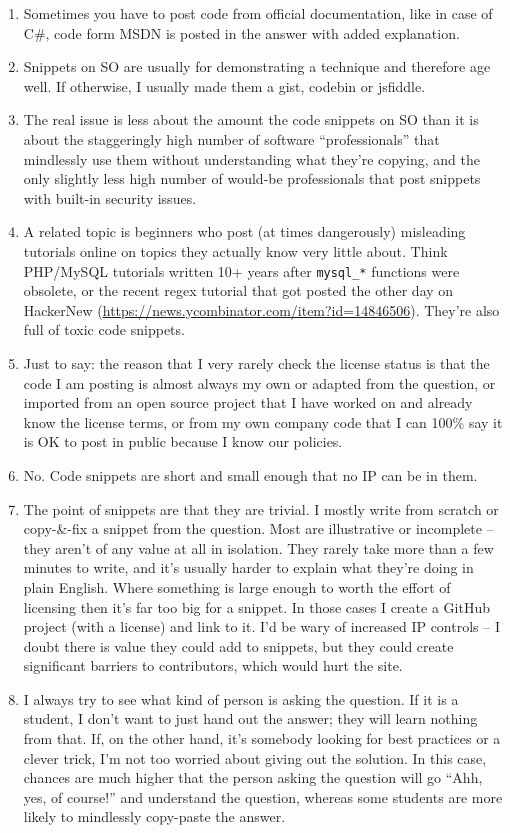 \documentclass{svjour3}                     %
\begin{document}
\begin{enumerate}
	\itemsep1em
	\item Sometimes you have to post code from official documentation, like in case of C\#, code form MSDN is posted in the answer with added explanation.
	\item Snippets on SO are usually for demonstrating a technique and therefore age well. If otherwise, I usually made them a gist, codebin or jsfiddle.
	\item The real issue is less about the amount the code snippets on SO than it is about the staggeringly high number of software ``professionals'' that mindlessly use them without understanding what they're copying, and the only slightly less high number of would-be professionals that post snippets with built-in security issues.
	\item A related topic is beginners who post (at times dangerously) misleading tutorials online on topics they actually know very little about. Think PHP/MySQL tutorials written 10+ years after \texttt{mysql\_*} functions were obsolete, or the recent regex tutorial that got posted the other day on HackerNew (\url{https://news.ycombinator.com/item?id=14846506}). They're also full of toxic code snippets.
	\item Just to say: the reason that I very rarely check the license status is that the code I am posting is almost always my own or adapted from the question, or imported from an open source project that I have worked on and already know the license terms, or from my own company code that I can 100\% say it is OK to post in public because I know our policies.
	\item No. Code snippets are short and small enough that no IP can be in them.
	\item The point of snippets are that they are trivial. I mostly write from scratch or copy-\&-fix a snippet from the question. Most are illustrative or incomplete -- they aren't of any value at all in isolation. They rarely take more than a few minutes to write, and it's usually harder to explain what they're doing in plain English. Where something is large enough to worth the effort of licensing then it's far too big for a snippet. In those cases I create a GitHub project (with a license) and link to it. I'd be wary of increased IP controls -- I doubt there is value they could add to snippets, but they could create significant barriers to contributors, which would hurt the site.
	\item I always try to see what kind of person is asking the question. If it is a student, I don't want to just hand out the answer; they will learn nothing from that. If, on the other hand, it's somebody looking for best practices or a clever trick, I'm not too worried about giving out the solution. In this case, chances are much higher that the person asking the question will go ``Ahh, yes, of course!'' and understand the question, whereas some students are more likely to mindlessly copy-paste the answer.

\end{enumerate}
\end{document}
